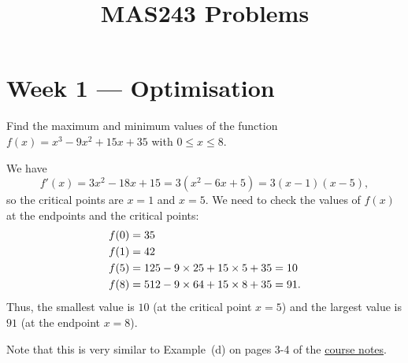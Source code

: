 \documentclass[a4paper]{amsart}
\title{MAS243 Problems}
\renewenvironment{solution}{\SolutionInline}{\endSolutionInline}
\begin{document}
\maketitle

\section*{Week 1 --- Optimisation}

\begin{exercise}
 Find the maximum and minimum values of the function
 $f(x)=x^3-9x^2+15x+35$ with $0\leq x\leq 8$.
\end{exercise}
\begin{solution}
 We have 
 \[ f'(x)=3x^2-18x+15=3(x^2-6x+5)=3(x-1)(x-5), \]
 so the critical points are $x=1$ and $x=5$.  We need to check the
 values of $f(x)$ at the endpoints and the critical points:
 \begin{align*}
  f(0) &= 35 \\
  f(1) &= 42 \\
  f(5) &= 125-9\times 25+15\times 5+35 = 10 \\
  f(8) &= 512-9\times 64+15\times 8+35 = 91.
 \end{align*}
 Thus, the smallest value is $10$ (at the critical point $x=5$) and
 the largest value is $91$ (at the endpoint $x=8$).
 \begin{center}
 \end{center}
 Note that this is very similar to Example~(d) on pages 3-4 of the 
 \href{http://shef.ac.uk/nps/courses/MAS243/MAS243.pdf}{course notes}.
\end{solution}
\end{document}

